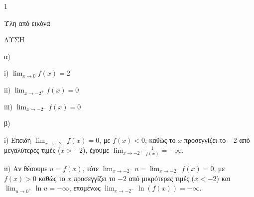\begin{ylh}{1}
    \item [Ύλη από εικόνα]
\end{ylh}
ΛΥΣΗ
\begin{alist}
    \item[α)]
    \begin{rlist}
        \item[i)] $\lim_{x \to 0} f(x) = 2$
        \item[ii)] $\lim_{x \to -2^+} f(x) = 0$
        \item[iii)] $\lim_{x \to -2^-} f(x) = 0$
    \end{rlist}

    \item[β)]
    \begin{rlist}
        \item[i)] Επειδή $\lim_{x \to -2^+} f(x) = 0$, με $f(x) < 0$, καθώς το $x$ προσεγγίζει το $-2$ από μεγαλύτερες τιμές ($x>-2$), έχουμε $\lim_{x \to -2^+} \frac{1}{f(x)} = -\infty$.
        \item[ii)] Αν θέσουμε $u = f(x)$, τότε $\lim_{x \to -2^-} u = \lim_{x \to -2^-} f(x) = 0$, με $f(x) > 0$ καθώς το $x$ προσεγγίζει το $-2$ από μικρότερες τιμές ($x<-2$) και $\lim_{u \to 0^+} \ln u = -\infty$, επομένως $\lim_{x \to -2^-} \ln(f(x)) = -\infty$.
    \end{rlist}
\end{alist}